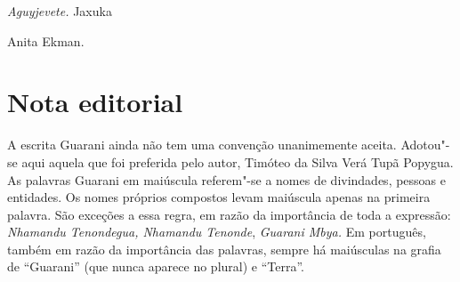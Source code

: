 \medskip{} 

\hfill \emph{Aguyjevete.}
Jaxuka

\hfill Anita Ekman.

 

 

\section{Nota editorial}

A escrita Guarani ainda não tem uma convenção unanimemente aceita.
Adotou"-se aqui aquela que foi preferida pelo autor, Timóteo da Silva
Verá Tupã Popygua. As palavras Guarani em maiúscula referem"-se a nomes
de divindades, pessoas e entidades. Os nomes próprios compostos levam
maiúscula apenas na primeira palavra. São exceções a essa regra, em
razão da importância de toda a expressão: \emph{Nhamandu Tenondegua,
Nhamandu Tenonde}, \emph{Guarani Mbya.} Em português, também em razão da
importância das palavras, sempre há maiúsculas na grafia de ``Guarani''
(que nunca aparece no plural) e ``Terra''.
